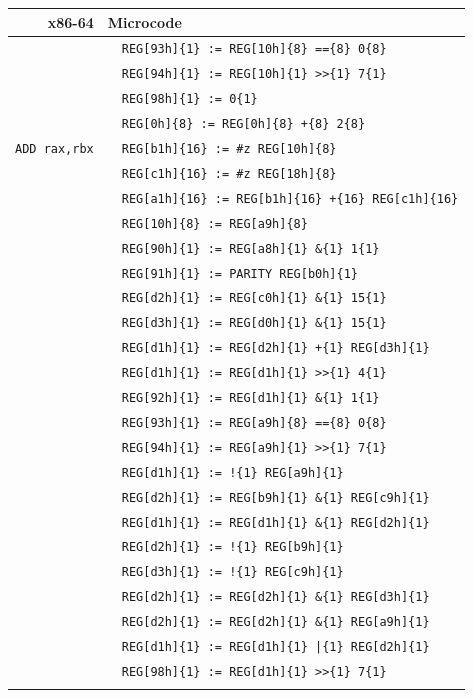 \documentclass[10pt,twocolumn]{article}
\begin{document}
\begin{table}[!h]
\begin{center}
\begin{tabular}{r|rl}
\textbf{x86-64} & \multicolumn{2}{l}{\textbf{Microcode}}
\\ \hline

& 
& \texttt{REG[93h]\{1\} := REG[10h]\{8\} ==\{8\} 0\{8\}} \\ & %
& \texttt{REG[94h]\{1\} := REG[10h]\{1\} >>\{1\} 7\{1\}} \\ & %
& \texttt{REG[98h]\{1\} := 0\{1\}} \\ & %
& \texttt{REG[0h]\{8\} := REG[0h]\{8\} +\{8\} 2\{8\}} \\ \hline


\texttt{ADD rax,rbx} & %
& \texttt{REG[b1h]\{16\} := \#z REG[10h]\{8\}} \\ & %
& \texttt{REG[c1h]\{16\} := \#z REG[18h]\{8\}} \\ & %
& \texttt{REG[a1h]\{16\} := REG[b1h]\{16\} +\{16\} REG[c1h]\{16\}} \\ & %
& \texttt{REG[10h]\{8\} := REG[a9h]\{8\}} \\ & %

& \texttt{REG[90h]\{1\} := REG[a8h]\{1\} \&\{1\} 1\{1\}} \\ & %

& \texttt{REG[91h]\{1\} := PARITY REG[b0h]\{1\}} \\ & %

& \texttt{REG[d2h]\{1\} := REG[c0h]\{1\} \&\{1\} 15\{1\}} \\ & %
& \texttt{REG[d3h]\{1\} := REG[d0h]\{1\} \&\{1\} 15\{1\}} \\ & %
& \texttt{REG[d1h]\{1\} := REG[d2h]\{1\} +\{1\} REG[d3h]\{1\}} \\ & %
& \texttt{REG[d1h]\{1\} := REG[d1h]\{1\} >>\{1\} 4\{1\}} \\ & %
& \texttt{REG[92h]\{1\} := REG[d1h]\{1\} \&\{1\} 1\{1\}} \\ & %

& \texttt{REG[93h]\{1\} := REG[a9h]\{8\} ==\{8\} 0\{8\}} \\ & %
& \texttt{REG[94h]\{1\} := REG[a9h]\{1\} >>\{1\} 7\{1\}} \\ & %

& \texttt{REG[d1h]\{1\} := !\{1\} REG[a9h]\{1\}} \\ & %
& \texttt{REG[d2h]\{1\} := REG[b9h]\{1\} \&\{1\} REG[c9h]\{1\}} \\ & %
& \texttt{REG[d1h]\{1\} := REG[d1h]\{1\} \&\{1\} REG[d2h]\{1\}} \\ & %
& \texttt{REG[d2h]\{1\} := !\{1\} REG[b9h]\{1\}} \\ & %
& \texttt{REG[d3h]\{1\} := !\{1\} REG[c9h]\{1\}} \\ & %
& \texttt{REG[d2h]\{1\} := REG[d2h]\{1\} \&\{1\} REG[d3h]\{1\}} \\ & %
& \texttt{REG[d2h]\{1\} := REG[d2h]\{1\} \&\{1\} REG[a9h]\{1\}} \\ & %
& \texttt{REG[d1h]\{1\} := REG[d1h]\{1\} |\{1\} REG[d2h]\{1\}} \\ & %
& \texttt{REG[98h]\{1\} := REG[d1h]\{1\} >>\{1\} 7\{1\}} \\ & %


\end{tabular}
\end{center}
\end{table}
\end{document}
